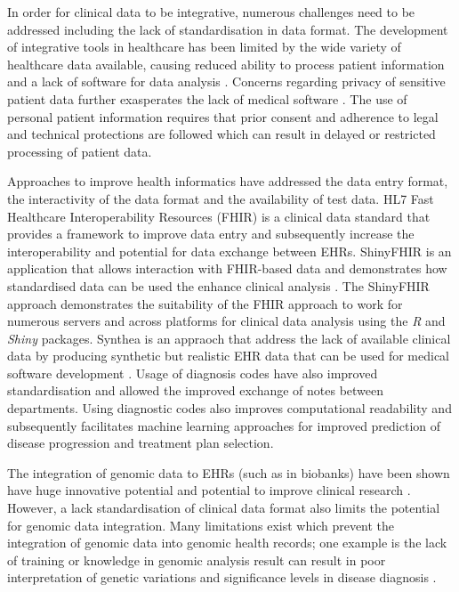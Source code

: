 \documentclass{bioinfo}
\begin{document}
In order for clinical data to be integrative, numerous challenges need to be addressed including the lack of standardisation in data format. The development of integrative tools in healthcare has been limited by the wide variety of healthcare data available, causing reduced ability to process patient information and a lack of software for data analysis \citep{Evans2016}.  Concerns regarding privacy of sensitive patient data further exasperates the lack of medical software \cite{Ross2014}. The use of personal patient information requires that prior consent and adherence to legal and technical protections are followed which can result in delayed or restricted processing of patient data. 


Approaches to improve health informatics have addressed the data entry format, the interactivity of the data format and the availability of test data. HL7 Fast Healthcare Interoperability Resources (FHIR) \cite{Hong2017}  is a clinical data standard that provides a framework to improve data entry and subsequently increase the interoperability and potential for data exchange between EHRs. ShinyFHIR is an application that allows interaction with FHIR-based data and demonstrates how standardised data can be used the enhance clinical analysis \cite{Hong2017}. 
The ShinyFHIR approach demonstrates the suitability of the FHIR approach to work for numerous servers and across platforms for clinical data analysis using the \textit{R} and \textit{Shiny} packages. Synthea is an appraoch that address the lack of available clinical data by producing synthetic but realistic EHR data that can be used for medical software development \citep{Synthea}. Usage of diagnosis codes have also improved standardisation and allowed the improved exchange of notes between departments. Using diagnostic codes also improves computational readability and subsequently facilitates machine learning approaches for improved prediction of disease progression and treatment plan selection. 

The integration of genomic data to EHRs (such as in biobanks) have been shown have huge innovative potential and potential to improve clinical research \citep{Denny2012}. However, a lack standardisation of clinical data format also limits the potential for genomic data integration. Many limitations exist which prevent the integration of genomic data into genomic health records; one example is the lack of training or knowledge in genomic analysis result can result in poor interpretation of genetic variations and significance levels in disease diagnosis \citep{Fein2014}.  
\end{document}
